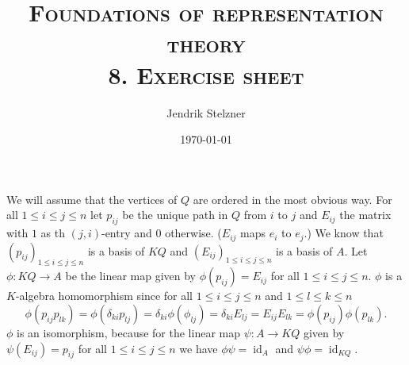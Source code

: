 \documentclass[a4paper,10pt]{article}
\title{\textsc{Foundations of representation theory \\ \Large 8. Exercise sheet}}
\author{Jendrik Stelzner}
\date{\today}
\theoremstyle{definition}
\newcommand{\id}{\operatorname{id}}
\begin{document}
\maketitle





\section{}
We will assume that the vertices of $Q$ are ordered in the most obvious way. For all $1 \leq i \leq j \leq n$  let $p_{ij}$ be the unique path in $Q$ from $i$ to $j$ and $E_{ij}$ the matrix with $1$ as th $(j,i)$-entry and $0$ otherwise. ($E_{ij}$ maps $e_i$ to $e_j$.) We know that $(p_{ij})_{1 \leq i \leq j \leq n}$ is a basis of $KQ$ and $(E_{ij})_{1 \leq i \leq j \leq n}$ is a basis of $A$. Let $\phi : KQ \rightarrow A$ be the linear map given by $\phi(p_{ij}) = E_{ij}$ for all $1 \leq i \leq j \leq n$. $\phi$ is a $K$-algebra homomorphism since for all $1 \leq i \leq j \leq n$ and $1 \leq l \leq k \leq n$
\[
 \phi(p_{ij} p_{lk})
 = \phi(\delta_{ki} p_{lj})
 = \delta_{ki} \phi(\phi_{lj})
 = \delta_{ki} E_{lj}
 = E_{ij} E_{lk}
 = \phi(p_{ij}) \phi(p_{lk}).
\]
$\phi$ is an isomorphism, because for the linear map $\psi: A \rightarrow KQ$ given by $\psi(E_{ij}) = p_{ij}$ for all $1 \leq i \leq j \leq n$ we have $\phi \psi = \id_A$ and $\psi \phi = \id_{KQ}$.
\end{document}
